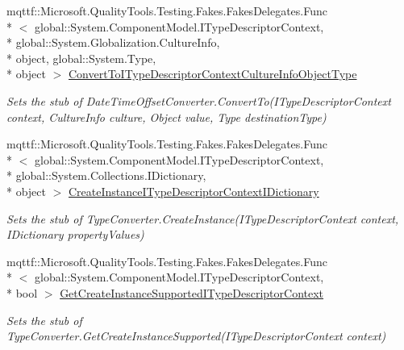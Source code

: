 \begin{DoxyCompactItemize}
mqttf\-::\-Microsoft.\-Quality\-Tools.\-Testing.\-Fakes.\-Fakes\-Delegates.\-Func\\*
$<$ global\-::\-System.\-Component\-Model.\-I\-Type\-Descriptor\-Context, \\*
global\-::\-System.\-Globalization.\-Culture\-Info, \\*
object, global\-::\-System.\-Type, \\*
object $>$ \hyperlink{class_system_1_1_component_model_1_1_fakes_1_1_stub_date_time_offset_converter_aa7213647315507630df380591db6950f}{Convert\-To\-I\-Type\-Descriptor\-Context\-Culture\-Info\-Object\-Type}
\begin{DoxyCompactList}\small\item\em Sets the stub of Date\-Time\-Offset\-Converter.\-Convert\-To(\-I\-Type\-Descriptor\-Context context, Culture\-Info culture, Object value, Type destination\-Type)\end{DoxyCompactList}\item 
mqttf\-::\-Microsoft.\-Quality\-Tools.\-Testing.\-Fakes.\-Fakes\-Delegates.\-Func\\*
$<$ global\-::\-System.\-Component\-Model.\-I\-Type\-Descriptor\-Context, \\*
global\-::\-System.\-Collections.\-I\-Dictionary, \\*
object $>$ \hyperlink{class_system_1_1_component_model_1_1_fakes_1_1_stub_date_time_offset_converter_a42b85c3c4640e0d5294ce1aabdaefa5b}{Create\-Instance\-I\-Type\-Descriptor\-Context\-I\-Dictionary}
\begin{DoxyCompactList}\small\item\em Sets the stub of Type\-Converter.\-Create\-Instance(\-I\-Type\-Descriptor\-Context context, I\-Dictionary property\-Values)\end{DoxyCompactList}\item 
mqttf\-::\-Microsoft.\-Quality\-Tools.\-Testing.\-Fakes.\-Fakes\-Delegates.\-Func\\*
$<$ global\-::\-System.\-Component\-Model.\-I\-Type\-Descriptor\-Context, \\*
bool $>$ \hyperlink{class_system_1_1_component_model_1_1_fakes_1_1_stub_date_time_offset_converter_a3aa5c71748756f77d55839a5c74cf3aa}{Get\-Create\-Instance\-Supported\-I\-Type\-Descriptor\-Context}
\begin{DoxyCompactList}\small\item\em Sets the stub of Type\-Converter.\-Get\-Create\-Instance\-Supported(\-I\-Type\-Descriptor\-Context context)\end{DoxyCompactList}\item 

\end{DoxyCompactItemize}
